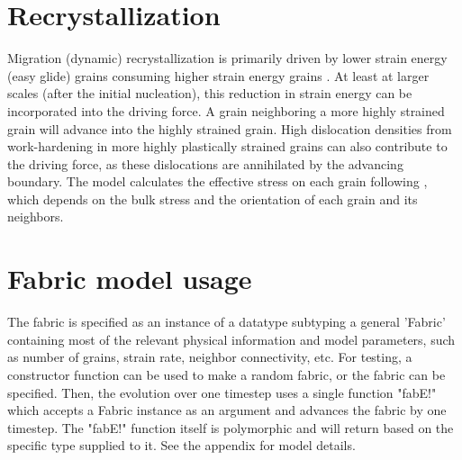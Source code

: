 \documentclass{article}
\begin{document}
\section{Recrystallization}
Migration (dynamic) recrystallization is primarily driven by lower strain energy (easy glide) grains consuming higher strain energy grains \citep{duval1995}. At least at larger scales (after the initial nucleation), this reduction in strain energy can be incorporated into the driving force. A grain neighboring a more highly strained grain will advance into the highly strained grain. High dislocation densities from work-hardening in more highly plastically strained grains can also contribute to the driving force, as these dislocations are annihilated by the advancing boundary. The model calculates the effective stress on each grain following \citet{azuma96}, which depends on the bulk stress and the orientation of each grain and its neighbors. 

\section{Fabric model usage}
The fabric is specified as an instance of a datatype subtyping a general 'Fabric' containing most of the relevant physical information and model parameters, such as number of grains, strain rate, neighbor connectivity, etc. For testing, a constructor function can be used to make a random fabric, or the fabric can be specified. Then, the evolution over one timestep uses a single function "fabE!" which accepts a Fabric instance as an argument and advances the fabric by one timestep. The "fabE!" function itself is polymorphic and will return based on the specific type supplied to it. See the appendix for model details.
\end{document}
